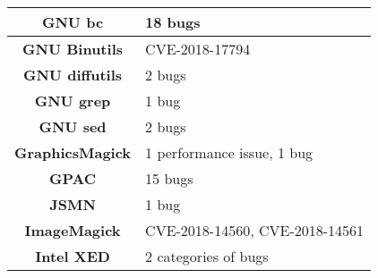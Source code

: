 \begin{table}[h]
\begin{tabular}{|c|l|}
\textbf{GNU bc}         & 18 bugs                                                                                                                                                                                            \\ \hline
\textbf{GNU Binutils}   & CVE-2018-17794                                                                                                                                                                                     \\ \hline
\textbf{GNU diffutils}  & 2 bugs                                                                                                                                                                                             \\ \hline
\textbf{GNU grep}       & 1 bug                                                                                                                                                                                              \\ \hline
\textbf{GNU sed}        & 2 bugs                                                                                                                                                                                             \\ \hline
\textbf{GraphicsMagick} & 1 performance issue, 1 bug                                                                                                                                                                         \\ \hline
\textbf{GPAC}           & 15 bugs                                                                                                                                                                                            \\ \hline
\textbf{JSMN}           & 1 bug                                                                                                                                                                                              \\ \hline
\textbf{ImageMagick}    & CVE-2018-14560, CVE-2018-14561                                                                                                                                                                     \\ \hline
\textbf{Intel XED}      & 2 categories of bugs                                                                                                                                                                               \\ \hline

\end{tabular}
\end{table}
